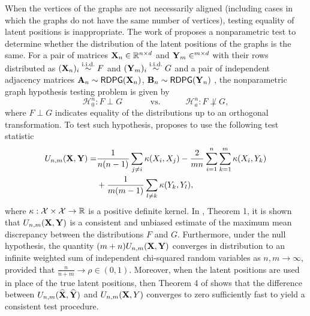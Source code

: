 When the vertices of the graphs are not necessarily aligned (including cases in which the graphs do not have the same number of vertices), testing equality of latent positions is inappropriate. The work of \cite{tang2017nonparametric} proposes a nonparametric test to determine whether the distribution of the latent positions of the graphs is the same. For a pair of matrices $\operatorname{\mathbf{X}}_n\in\mathbb{R}^{n\times d}$ and $\Y_m\in\real^{m\times d}$ with their rows distributed as $(\operatorname{\mathbf{X}}_n)_i\overset{\text{i.i.d.}}{\sim} F$ and $(\operatorname{\mathbf{Y}}_m)_i\overset{\text{i.i.d.}}{\sim} G$ and a pair of independent adjacency matrices $\operatorname{\mathbf{A}}_n\sim\operatorname{\mathsf{RDPG}}(\operatorname{\mathbf{X}}_n)$, $\operatorname{\mathbf{B}}_n\sim\operatorname{\mathsf{RDPG}}(\operatorname{\mathbf{Y}}_n)$ , the nonparametric graph hypothesis testing problem is given by
\begin{equation*}
    \mathcal{H}^n_0:F \perp G \quad\quad\quad \text{ vs.}\quad\quad\quad \mathcal{H}^n_a: F \not\perp G,
\end{equation*}
where $F\perp G$ indicates equality of the distributions up to an orthogonal transformation. To test such hypothesis, \cite{tang2017nonparametric} proposes to use the following test statistic
\begin{align*}
    U_{n,m}(\operatorname{\mathbf{X}}, \operatorname{\mathbf{Y}})=& \frac{1}{n(n-1)}\sum_{j\neq i}\kappa(X_i, X_j)-\frac{2}{mn}\sum_{i=1}^n\sum_{k=1}^m\kappa(X_i, Y_k)\\
    & + \frac{1}{m(m-1)}\sum_{l\neq k}\kappa(Y_k, Y_l),
\end{align*}
where $\kappa:\mathcal{X}\times \mathcal{X}\rightarrow\mathbb{R}$ is a positive definite kernel. In \cite{tang2017nonparametric}, Theorem 1, it is shown that $U_{n,m}(\operatorname{\mathbf{X}}, \operatorname{\mathbf{Y}})$ is a consistent and unbiased estimate of the maximum mean discrepancy \cite{gretton2012kernel} between the distributions $F$ and $G$. Furthermore, under the null hypothesis, the quantity $(m+n)U_{n,m}(\operatorname{\mathbf{X}}, \operatorname{\mathbf{Y}})$ converges in distribution to an infinite weighted sum of independent chi-squared random variables as $n,m\rightarrow \infty$, provided that $\frac{n}{n+m}\rightarrow \rho \in (0, 1)$.  Moreover, when the latent positions are used in place of the true latent positions, then Theorem 4 of \cite{tang2017nonparametric} shows that the difference between $U_{n,m}(\widehat{\operatorname{\mathbf{X}}}, \widehat{\operatorname{\mathbf{Y}}})$  and $U_{n,m}(\operatorname{\mathbf{X}}, Y)$ converges to zero sufficiently fast to yield a consistent test procedure.


